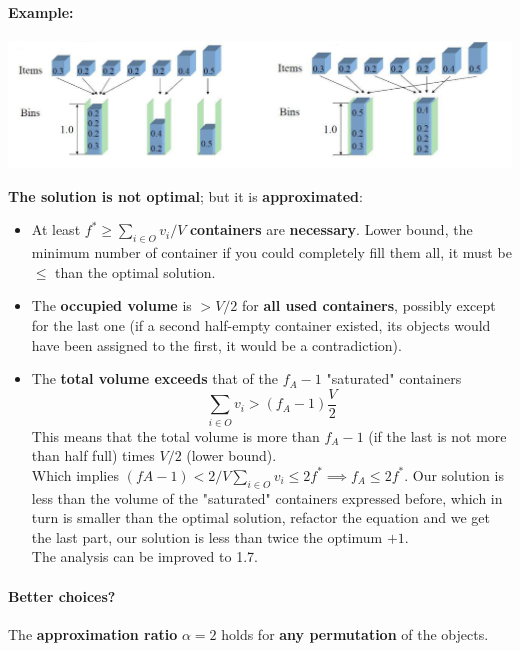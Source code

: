 \paragraph{Example:}
\begin{center}
	\includegraphics[width=\columnwidth]{img/CHBPP1}
\end{center}
\textbf{The solution is not optimal}; but it is \textbf{approximated}:
\begin{itemize}
	\item At least $f^\ast \geq \sum_{i \in O} v_i / V$ \textbf{containers} are \textbf{necessary}. Lower bound, the minimum number of container if you could completely fill them all, it must be $\leq$ than the optimal solution.\\
	
	\item The \textbf{occupied volume} is $> V/2$ for \textbf{all used containers}, possibly except for the last one (if a second half-empty container existed, its objects would have been assigned to the first, it would be a contradiction).\\
	
	\item The \textbf{total volume exceeds} that of the $f_A − 1$ "saturated" containers
	$$ \sum_{i \in O} v_i > (f_A - 1)\frac{V}{2} $$
	This means that the total volume is more than $f_A - 1$ (if the last is not more than half full) times $V/2$ (lower bound).\\
	Which implies $(fA − 1) < 2/V \sum_{i \in O} v_i \leq 2f^\ast \implies f_A \leq 2f^\ast$. Our solution is less than the volume of the "saturated" containers expressed before, which in turn is smaller than the optimal solution, refactor the equation and we get the last part, our solution is less than twice the optimum $+1$.\\
	The analysis can be improved to 1.7.\\
\end{itemize}

\newpage

\paragraph{Better choices?} The \textbf{approximation ratio} $\alpha = 2$ holds for \textbf{any permutation} of the objects.\\

